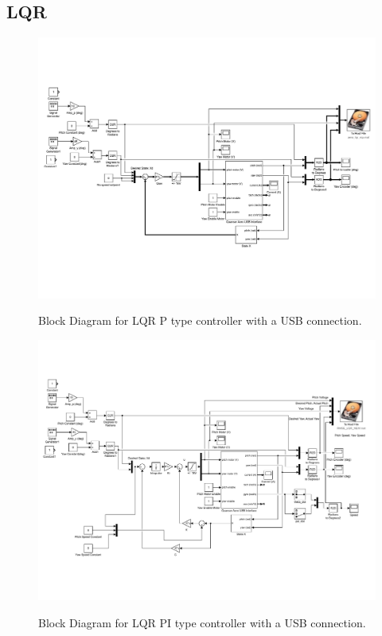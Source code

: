 \subsection{LQR}
\begin{figure}[!htbp]
    \centering
    \includegraphics[width=.8\textwidth,keepaspectratio=true]{figs/img/LQR_USB}
    \label{fig:LQR_P_USB_Block_Diagram}
    \caption{Block Diagram for LQR P type controller with a USB connection.}
\end{figure}
\begin{figure}[!htbp]
    \centering
    \includegraphics[width=.8\textwidth,keepaspectratio=true]{figs/img/LQR_PI_USB}
    \label{fig:LQR_PI_USB_Block_Diagram}
    \caption{Block Diagram for LQR PI type controller with a USB connection.}
\end{figure}
